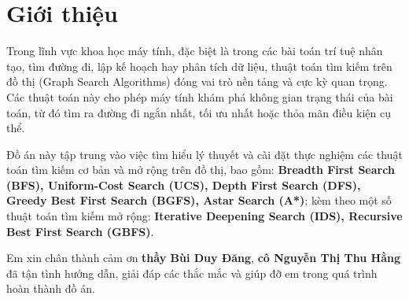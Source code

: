 \section{Giới thiệu}

Trong lĩnh vực khoa học máy tính, đặc biệt là trong các bài toán trí tuệ nhân tạo, tìm đường đi, lập kế hoạch hay phân tích dữ liệu, thuật toán tìm kiếm trên đồ thị (Graph Search Algorithms) đóng vai trò nền tảng và cực kỳ quan trọng. Các thuật toán này cho phép máy tính khám phá không gian trạng thái của bài toán, từ đó tìm ra đường đi ngắn nhất, tối ưu nhất hoặc thỏa mãn điều kiện cụ thể.

Đồ án này tập trung vào việc tìm hiểu lý thuyết và cài đặt thực nghiệm các thuật toán tìm kiếm cơ bản và mở rộng trên đồ thị, bao gồm: \textbf{Breadth First Search (BFS), Uniform-Cost Search (UCS), Depth First Search (DFS), Greedy Best First Search (BGFS), Astar Search (A*)}; kèm theo một số thuật toán tìm kiếm mở rộng: \textbf{Iterative Deepening Search (IDS), Recursive Best First Search (GBFS)}. 

Em xin chân thành cảm ơn \textbf{thầy Bùi Duy Đăng}, \textbf{cô Nguyễn Thị Thu Hằng} đã tận tình hướng dẫn, giải đáp các thắc mắc và giúp đỡ em trong quá trình hoàn thành đồ án.